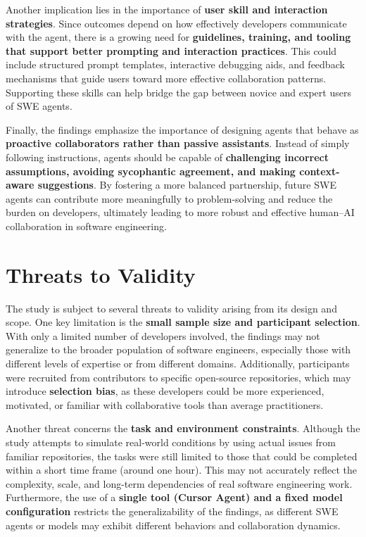 Another implication lies in the importance of \textbf{user skill and interaction strategies}. Since outcomes depend on how effectively developers communicate with the agent, there is a growing need for \textbf{guidelines, training, and tooling that support better prompting and interaction practices}. This could include structured prompt templates, interactive debugging aids, and feedback mechanisms that guide users toward more effective collaboration patterns. Supporting these skills can help bridge the gap between novice and expert users of SWE agents.

Finally, the findings emphasize the importance of designing agents that behave as \textbf{proactive collaborators rather than passive assistants}. Instead of simply following instructions, agents should be capable of \textbf{challenging incorrect assumptions, avoiding sycophantic agreement, and making context-aware suggestions}. By fostering a more balanced partnership, future SWE agents can contribute more meaningfully to problem-solving and reduce the burden on developers, ultimately leading to more robust and effective human–AI collaboration in software engineering.

\section{Threats to Validity}
The study is subject to several threats to validity arising from its design and scope. One key limitation is the \textbf{small sample size and participant selection}. With only a limited number of developers involved, the findings may not generalize to the broader population of software engineers, especially those with different levels of expertise or from different domains. Additionally, participants were recruited from contributors to specific open-source repositories, which may introduce \textbf{selection bias}, as these developers could be more experienced, motivated, or familiar with collaborative tools than average practitioners.

Another threat concerns the \textbf{task and environment constraints}. Although the study attempts to simulate real-world conditions by using actual issues from familiar repositories, the tasks were still limited to those that could be completed within a short time frame (around one hour). This may not accurately reflect the complexity, scale, and long-term dependencies of real software engineering work. Furthermore, the use of a \textbf{single tool (Cursor Agent) and a fixed model configuration} restricts the generalizability of the findings, as different SWE agents or models may exhibit different behaviors and collaboration dynamics.

